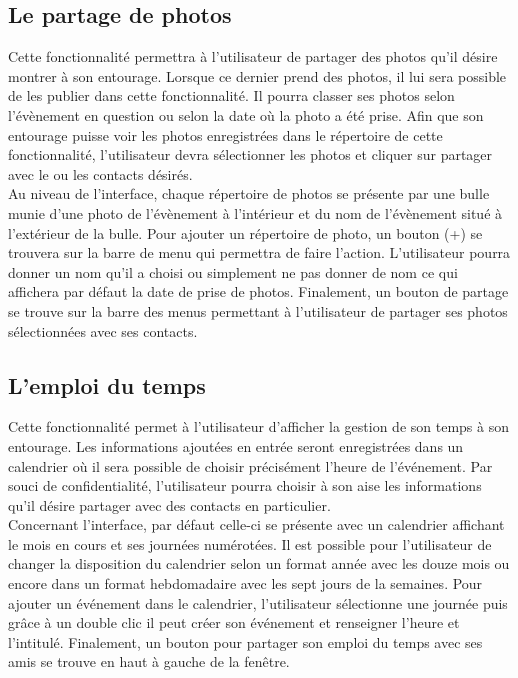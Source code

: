 \documentclass[11pt]{article}
\begin{document}
\subsection{Le partage de photos}\label{par:photos}
Cette fonctionnalité permettra à l’utilisateur de partager des photos qu’il désire montrer à son entourage. Lorsque ce dernier prend des photos, il lui sera possible de les publier dans cette fonctionnalité. Il pourra classer ses photos selon l’évènement en question ou selon la date où la photo a été prise. Afin que son entourage puisse voir les photos enregistrées dans le répertoire de cette fonctionnalité, l’utilisateur devra sélectionner les photos et cliquer sur partager avec le ou les contacts désirés.~\\

Au niveau de l’interface,  chaque répertoire de photos se présente par une bulle munie d’une photo de l’évènement à l’intérieur et du nom de l’évènement situé à l’extérieur de la bulle. Pour ajouter un répertoire de photo, un bouton (+) se trouvera sur la barre de menu qui permettra de faire l’action. L’utilisateur pourra donner un nom qu’il a choisi ou simplement ne pas donner de nom ce qui affichera par défaut la date de prise de photos. Finalement, un bouton de partage se trouve sur la barre des menus permettant à l’utilisateur de partager ses photos sélectionnées avec ses contacts.
\subsection{L'emploi du temps}\label{par:cal}
Cette fonctionnalité permet à l’utilisateur d’afficher la gestion de son temps à son entourage. Les informations ajoutées en entrée seront enregistrées dans un calendrier où il sera possible de choisir précisément l’heure de l'événement. Par souci de confidentialité, l’utilisateur pourra choisir à son aise les informations qu'il désire partager avec des contacts en particulier.~\\

Concernant l’interface, par défaut celle-ci se présente avec un calendrier affichant le mois en cours et ses journées numérotées. Il est possible pour l’utilisateur de changer la disposition du calendrier selon un format année avec les douze mois ou encore dans un format hebdomadaire avec les sept jours de la semaines. Pour ajouter un événement dans le calendrier, l'utilisateur sélectionne une journée puis grâce à un double clic il peut créer son événement et renseigner l'heure et l'intitulé. Finalement, un bouton pour partager son emploi du temps avec ses amis se trouve en haut à gauche de la fenêtre.
\end{document}
